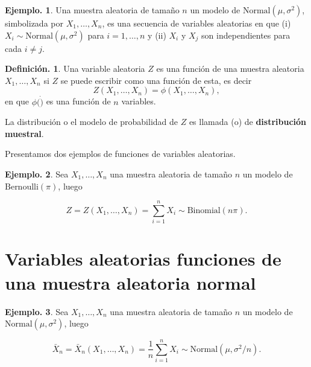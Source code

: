 \documentclass[]{book}
\theoremstyle{definition}
\newtheorem{definition}{Definición.}[chapter]
\theoremstyle{definition}
\newtheorem{example}{Ejemplo.}[chapter]
\theoremstyle{definition}
\theoremstyle{remark}
\begin{document}
\begin{example}
\protect\hypertarget{exm:unnamed-chunk-160}{}{\label{exm:unnamed-chunk-160} }
Una muestra aleatoria de tamaño \(n\) un modelo de
\(\mbox{Normal}(\mu,\sigma^2)\),
simbolizada por \(X_1,\ldots, X_n\), es una secuencia de variables aleatorias
en que (i) \(X_i \sim \mbox{Normal}(\mu,\sigma^2)\) para \(i=1,\ldots,n\) y (ii)
\(X_i\) y \(X_j\) son independientes para cada \(i \neq j\).
\end{example}

\begin{definition}
\protect\hypertarget{def:unnamed-chunk-161}{}{\label{def:unnamed-chunk-161} }
Una variable aleatoria \(Z\) es una función de una muestra aleatoria
\(X_1,\ldots,X_n\) si \(Z\) se puede escribir como una función de esta, es
decir
\[ Z(X_1,\ldots,X_n) = \phi(X_1,\ldots,X_n),   \]
en que \(\phi(\dot)\) es una función de \(n\) variables.

La distribución o el modelo de probabilidad de \(Z\) es llamada (o) de
\textbf{distribución muestral}.
\end{definition}

Presentamos dos ejemplos de funciones de variables aleatorias.

\begin{example}
\protect\hypertarget{exm:unnamed-chunk-162}{}{\label{exm:unnamed-chunk-162} }
Sea \(X_1,\ldots, X_n\) una muestra aleatoria de tamaño \(n\) un modelo de
\(\mbox{Bernoulli}(\pi)\), luego

\[  Z= Z(X_1,\ldots,X_n)= \sum_{i=1}^{n}X_i \sim \mbox{Binomial}(n\pi).  \]
\end{example}

\hypertarget{variables-aleatorias-funciones-de-una-muestra-aleatoria-normal}{%
\section{Variables aleatorias funciones de una muestra aleatoria normal}\label{variables-aleatorias-funciones-de-una-muestra-aleatoria-normal}}

\begin{example}
\protect\hypertarget{exm:unnamed-chunk-163}{}{\label{exm:unnamed-chunk-163} }
Sea \(X_1,\ldots, X_n\) una muestra aleatoria de tamaño \(n\) un modelo de
\(\mbox{Normal}(\mu,\sigma^2)\), luego

\[  \bar{X}_n= \bar{X}_n(X_1,\ldots,X_n)= \frac{1}{n}\sum_{i=1}^{n}X_i \sim
  \mbox{Normal}(\mu, \sigma^2/n).  \]
\end{example}
\end{document}
